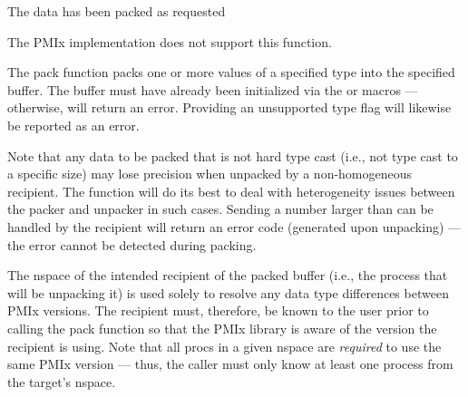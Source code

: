 \begin{arglist}
\end{arglist}

\begin{constantdesc}
\item {} The data has been packed as requested
\item {} The \ac{PMIx} implementation does not support this function.
\end{constantdesc}

\descr

The pack function packs one or more values of a specified type into the specified buffer.  The buffer must have already been
initialized via the  or 
macros --- otherwise,  will return an error.
Providing an unsupported type flag will likewise be reported as an error.

Note that any data to be packed that is not hard type cast (i.e.,
not type cast to a specific size) may lose precision when unpacked
by a non-homogeneous recipient.  The  function will do its best to deal
with heterogeneity issues between the packer and unpacker in such
cases. Sending a number larger than can be handled by the recipient
will return an error code (generated upon unpacking) ---
the error cannot be detected during packing.

The nspace of the intended recipient of the packed buffer (i.e., the
process that will be unpacking it) is used solely to resolve any data type
differences between \ac{PMIx} versions. The recipient must, therefore, be
known to the user prior to calling the pack function so that the
\ac{PMIx} library is aware of the version the recipient is using. Note that
all procs in a given nspace are \textit{required} to use the same \ac{PMIx}
version --- thus, the caller must only know at least one process from the
target's nspace.


